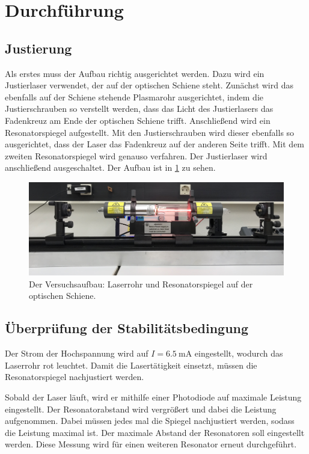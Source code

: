 \section{Durchführung}
\label{sec:Durchführung}

\subsection{Justierung}
Als erstes muss der Aufbau richtig ausgerichtet werden. Dazu wird ein Justierlaser verwendet, der auf der optischen Schiene steht. Zunächst wird das ebenfalls auf der Schiene stehende Plasmarohr ausgerichtet, indem die Justierschrauben so verstellt werden, dass das Licht des Justierlasers das Fadenkreuz am Ende der optischen Schiene trifft.
Anschließend wird ein Resonatorspiegel aufgestellt. Mit den Justierschrauben wird dieser ebenfalls so ausgerichtet, dass der Laser das Fadenkreuz auf der anderen Seite trifft. Mit dem zweiten Resonatorspiegel wird genauso verfahren. Der Justierlaser wird anschließend ausgeschaltet. Der Aufbau ist in \ref{fig:aufbau} zu sehen.

\begin{figure}
    \centering
    \includegraphics[width=12cm]{fotos/Aufbau2.JPG}
    \caption{Der Versuchsaufbau: Laserrohr und Resonatorspiegel auf der optischen Schiene.}
    \label{fig:aufbau}
\end{figure}    


\subsection{Überprüfung der Stabilitätsbedingung}
Der Strom der Hochspannung wird auf $I = \SI{6.5}{\milli\ampere}$ eingestellt, wodurch das Laserrohr rot leuchtet. Damit die Lasertätigkeit einsetzt, müssen die Resonatorspiegel nachjustiert werden.

Sobald der Laser läuft, wird er mithilfe einer Photodiode auf maximale Leistung eingestellt.
Der Resonatorabstand wird vergrößert und dabei die Leistung aufgenommen. Dabei müssen jedes mal die Spiegel nachjustiert werden, sodass die Leistung maximal ist. 
Der maximale Abstand der Resonatoren soll eingestellt werden.
Diese Messung wird für einen weiteren Resonator erneut durchgeführt.


